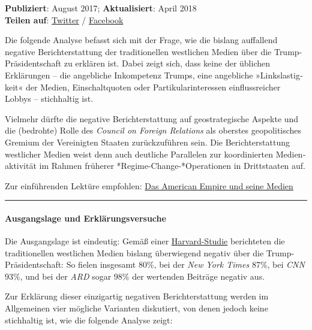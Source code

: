 \textbf{Publiziert}: August 2017; \textbf{Aktualisiert}: April 2018\\
\textbf{Teilen auf}:
\href{https://twitter.com/intent/tweet?url=https://swprs.org/trump-medien-geopolitik/}{Twitter}
/
\href{https://www.facebook.com/share.php?u=https://swprs.org/trump-medien-geopolitik/}{Facebook}

Die folgende Analyse befasst sich mit der Frage, wie die bislang
auffallend negative Bericht­erstattung der traditionellen westlichen
Medien über die Trump-Präsidentschaft zu erklären ist. Dabei zeigt sich,
dass keine der üblichen Erklärungen -- die angebliche Inkompetenz
Trumps, eine angebliche »Links­lastig­keit« der Medien, Einschaltquoten
oder Partikularinteressen einflussreicher Lobbys -- stichhaltig ist.

Vielmehr dürfte die negative Berichterstattung auf geostrategische
Aspekte und die (bedrohte) Rolle des \emph{Council on Foreign Relations}
als oberstes geopolitisches Gremium der Vereinigten Staaten
zurück­zu­führen sein. Die Bericht­erstattung westlicher Medien weist
denn auch deutliche Parallelen zur koordinierten Medien­aktivität im
Rahmen früherer *Regime-Change-*Operationen in Drittstaaten auf.

Zur einführenden Lektüre empfohlen:
\href{https://swprs.org/das-american-empire-und-seine-medien/}{Das
American Empire und seine Medien}

\begin{center}\rule{0.5\linewidth}{\linethickness}\end{center}

\hypertarget{ausgangslage-und-erkluxe4rungsversuche}{%
\paragraph{Ausgangslage und
Erklärungsversuche}\label{ausgangslage-und-erkluxe4rungsversuche}}

Die Ausgangslage ist eindeutig: Gemäß einer
\href{http://meedia.de/2017/05/23/harvard-studie-keiner-berichtete-negativer-ueber-donald-trump-als-die-ard/}{Harvard-Studie}
berichteten die traditionellen westlichen Medien bislang überwiegend
negativ über die Trump-Präsidentschaft: So fielen insgesamt 80\%, bei
der \emph{New York Times} 87\%, bei \emph{CNN} 93\%, und bei der
\emph{ARD} sogar 98\% der wertenden Beiträge negativ aus.

Zur Erklärung dieser einzigartig negativen Berichterstattung werden im
Allgemeinen vier mögliche Varianten diskutiert, von denen jedoch keine
stichhaltig ist, wie die folgende Analyse zeigt:

